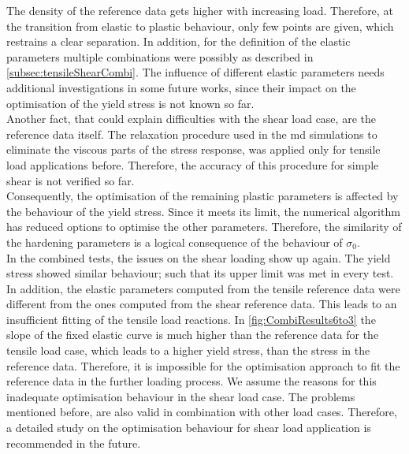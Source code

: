 The density of the reference data gets higher with increasing load.
Therefore, at the transition from elastic to plastic behaviour, only few points are given, which restrains a clear separation. In addition, for the definition of the elastic parameters multiple combinations were possibly as described in \autoref{subsec:tensileShearCombi}. The influence of different elastic parameters needs additional investigations in some future works, since their impact on the optimisation of the yield stress is not known so far. \\
\indent Another fact, that could explain difficulties with the shear load case, are the reference data itself. The relaxation procedure used in the \acrshort{md} simulations to eliminate the viscous parts of the stress response, was applied only for tensile load applications before. Therefore, the accuracy of this procedure for simple shear is not verified so far. \\
\indent Consequently, the optimisation of the remaining plastic parameters is affected by the behaviour of the yield stress. Since it meets its limit, the numerical algorithm has reduced options to optimise the other parameters. Therefore, the similarity of the hardening parameters is a logical consequence of the behaviour of $\sigma_0$. \\
\indent In the combined tests, the issues on the shear loading show up again. The yield stress showed similar behaviour; such that its upper limit was met in every test.
In addition, the elastic parameters computed from the tensile reference data were different from the ones computed from the shear reference data.
This leads to an insufficient fitting of the tensile load reactions. In \autoref{fig:CombiResults6to3} the slope of the fixed elastic curve is much higher than the reference data for the tensile load case, which leads to a higher yield stress, than the stress in the reference data. Therefore, it is impossible for the optimisation approach to fit the reference data in the further loading process. We assume the reasons for this inadequate optimisation behaviour in the shear load case. The problems mentioned before, are also valid in combination with other load cases. Therefore, a detailed study on the optimisation behaviour for shear load application is recommended in the future.

 



